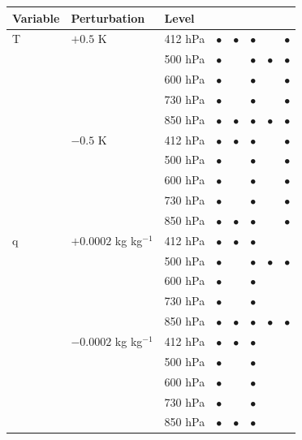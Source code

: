 \documentclass[draft]{agujournal2019}
\begin{document}
{\begin{table}
\begin{tabular}{lllccccc}
        \textbf{Variable} & \textbf{Perturbation} & \textbf{Level} & & & & & \\
        \hline
        T & $+0.5$ K & 412 hPa & $\bullet{}$ & $\bullet{}$ & $\bullet{}$ &  & $\bullet{}$ \\
        & & 500 hPa & $\bullet{}$ & & $\bullet{}$ & $\bullet{}$ & $\bullet{}$ \\
        & & 600 hPa & $\bullet{}$ & & $\bullet{}$ &  & $\bullet{}$ \\
        & & 730 hPa & $\bullet{}$ & & $\bullet{}$ &  & $\bullet{}$ \\
        & & 850 hPa & $\bullet{}$ & $\bullet{}$ & $\bullet{}$ & $\bullet{}$ & $\bullet{}$ \\
        & $-0.5$ K & 412 hPa & $\bullet{}$ & $\bullet{}$ & $\bullet{}$ &  & $\bullet{}$ \\
        & & 500 hPa & $\bullet{}$ & & $\bullet{}$ &  & $\bullet{}$\\
        & & 600 hPa & $\bullet{}$ & & $\bullet{}$ &  & $\bullet{}$ \\
        & & 730 hPa & $\bullet{}$ & & $\bullet{}$ &  & $\bullet{}$ \\
        & & 850 hPa & $\bullet{}$ & $\bullet{}$ & $\bullet{}$ &  & $\bullet{}$ \\
        \hline
        q & $+0.0002$ kg kg$^{-1}$ & 412 hPa & $\bullet{}$ & $\bullet{}$ & $\bullet{}$ &  &  \\
        & & 500 hPa & $\bullet{}$ & & $\bullet{}$ & $\bullet{}$ & $\bullet{}$ \\
        & & 600 hPa & $\bullet{}$ & & $\bullet{}$ &  &  \\
        & & 730 hPa & $\bullet{}$ & & $\bullet{}$ &  &  \\
        & & 850 hPa & $\bullet{}$ & $\bullet{}$ & $\bullet{}$ & $\bullet{}$ & $\bullet{}$ \\
        & $-0.0002$ kg kg$^{-1}$ & 412 hPa & $\bullet{}$ & $\bullet{}$ & $\bullet{}$ &  &  \\
        & & 500 hPa & $\bullet{}$ & & $\bullet{}$ &  &  \\
        & & 600 hPa & $\bullet{}$ & & $\bullet{}$ &  &  \\
        & & 730 hPa & $\bullet{}$ & & $\bullet{}$ &  &  \\
        & & 850 hPa & $\bullet{}$ & $\bullet{}$ & $\bullet{}$ &  &  \\
        \hline
    \end{tabular}
\end{table}
}
\end{document}
